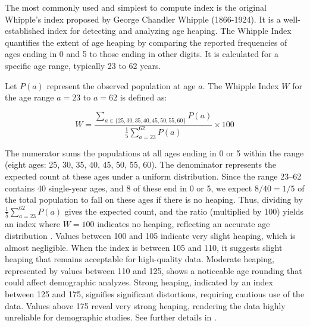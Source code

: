 \documentclass[pdflatex,sn-mathphys-num]{sn-jnl}%
\theoremstyle{thmstyleone}%
\theoremstyle{thmstyletwo}%
\theoremstyle{thmstylethree}%
\begin{document}
The most commonly used \citep{rasul23} and simplest to compute index is the original Whipple's index
proposed by George Chandler Whipple (1866-1924). It is a well-established index for detecting and analyzing age heaping. 
The Whipple Index quantifies the extent of age heaping by comparing the reported frequencies of ages ending in 0 and 5 to those ending in other digits. It is calculated for a specific age range, typically 23 to 62 years.

Let \( P(a) \) represent the observed population at age \( a \). The Whipple Index \( W \) for the age range \( a = 23 \) to \( a = 62 \) is defined as:

\[
W = \frac{\sum_{a \in \{25,30,35,40,45,50,55,60\}} P(a)}{\frac{1}{5} \sum_{a=23}^{62} P(a)} \times 100
\]

The numerator sums the populations at all ages ending in 0 or 5 within the 
range (eight ages: 25, 30, 35, 40, 45, 50, 55, 60). 
The denominator represents the expected count at these ages under 
a uniform distribution. Since the range 23--62 contains 40 single-year ages, 
and 8 of these end in 0 or 5, we expect $8/40 = 1/5$ of the total 
population to fall on these ages if there is no heaping. 
Thus, dividing by $\frac{1}{5} \sum_{a=23}^{62} P(a)$ gives the 
expected count, and the ratio (multiplied by 100) yields an index 
where $W = 100$ indicates no heaping, reflecting an accurate age distribution \cite{un55}. 
Values between 100 and 105 indicate very slight heaping, which is almost negligible. When the index is between 105 and 110, it suggests slight heaping that remains acceptable for high-quality data. Moderate heaping, represented by values between 110 and 125, shows a noticeable age rounding that could affect demographic analyzes. Strong heaping, indicated by an index between 125 and 175, signifies significant distortions, requiring cautious use of the data. Values above 175 reveal very strong heaping, rendering the data highly unreliable for demographic studies. See further details in \citep{shryock76}.
\end{document}
